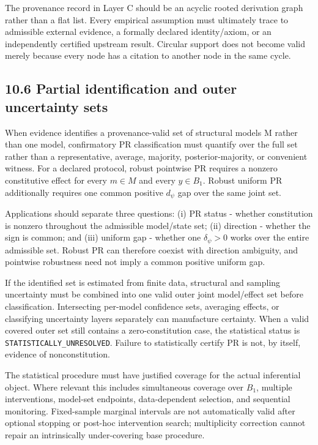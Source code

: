 \documentclass[10pt]{article}
\begin{document}
The provenance record in Layer C should be an acyclic rooted derivation
graph rather than a flat list. Every empirical assumption must
ultimately trace to admissible external evidence, a formally declared
identity/axiom, or an independently certified upstream result. Circular
support does not become valid merely because every node has a citation
to another node in the same cycle.

\subsection{10.6 Partial identification and outer uncertainty
sets}\label{partial-identification-and-outer-uncertainty-sets}

When evidence identifies a provenance-valid set of structural models M
rather than one model, confirmatory PR classification must quantify over
the full set rather than a representative, average, majority,
posterior-majority, or convenient witness. For a declared protocol,
robust pointwise PR requires a nonzero constitutive effect for every
\(m\in{}M\) and every \(y\in{}B_1\). Robust uniform PR additionally
requires one common positive \(d_\psi\) gap over the same joint set.

Applications should separate three questions: (i) PR status - whether
constitution is nonzero throughout the admissible model/state set; (ii)
direction - whether the sign is common; and (iii) uniform gap - whether
one \(\delta_\psi>0\) works over the entire admissible set. Robust PR
can therefore coexist with direction ambiguity, and pointwise robustness
need not imply a common positive uniform gap.

If the identified set is estimated from finite data, structural and
sampling uncertainty must be combined into one valid outer joint
model/effect set before classification. Intersecting per-model
confidence sets, averaging effects, or classifying uncertainty layers
separately can manufacture certainty. When a valid covered outer set
still contains a zero-constitution case, the statistical status is
\texttt{STATISTICALLY\_UNRESOLVED}. Failure to statistically certify PR
is not, by itself, evidence of nonconstitution.

The statistical procedure must have justified coverage for the actual
inferential object. Where relevant this includes simultaneous coverage
over \(B_1\), multiple interventions, model-set endpoints,
data-dependent selection, and sequential monitoring. Fixed-sample
marginal intervals are not automatically valid after optional stopping
or post-hoc intervention search; multiplicity correction cannot repair
an intrinsically under-covering base procedure.
\end{document}
